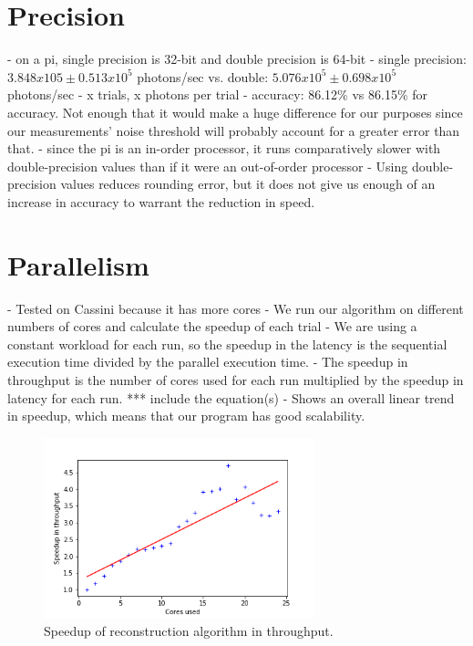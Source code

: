 \section{Precision}
- on a pi, single precision is 32-bit and double precision is 64-bit
- single precision: $3.848x105 \pm 0.513x10^5$ photons/sec vs. double: $5.076x10^5 \pm 0.698x10^5$ photons/sec
- x trials, x photons per trial
- accuracy: 86.12\% vs 86.15\% for accuracy. Not enough that it would make a huge difference for our purposes since our measurements' noise threshold will probably account for a greater error than that.
- since the pi is an in-order processor, it runs comparatively slower with double-precision values than if it were an out-of-order processor
- Using double-precision values reduces rounding error, but it does not give us enough of an increase in accuracy to warrant the reduction in speed.

\section{Parallelism}
- Tested on Cassini because it has more cores
- We run our algorithm on different numbers of cores and calculate the speedup of each trial
- We are using a constant workload for each run, so the speedup in the latency is the sequential execution time divided by the parallel execution time.
- The speedup in throughput is the number of cores used for each run multiplied by the speedup in latency for each run. *** include the equation(s)
- Shows an overall linear trend in speedup, which means that our program has good scalability.

\begin{figure}
    \centering
    \includegraphics[width=0.7\textwidth]{graphs/Cassini_throughput_speedup.png}
    \caption{Speedup of reconstruction algorithm in throughput.}
    \label{fig:through_speedup}
\end{figure}

